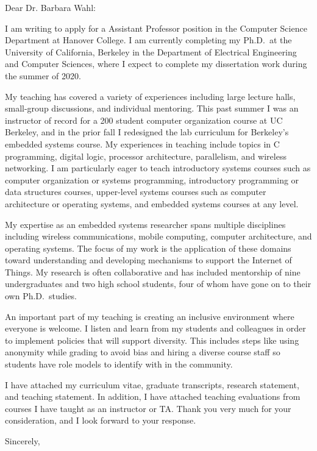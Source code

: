 \documentclass{letter}
\begin{document}
\begin{letter}{}
\date{}

\opening{Dear Dr. Barbara Wahl:}

I am writing to apply for a
Assistant Professor
position in the
Computer Science Department
at Hanover College.
%
I am currently completing my Ph.D.\ at the University of California, Berkeley
in the Department of Electrical Engineering and Computer Sciences, where I
expect to complete my dissertation work during the summer of 2020.

My teaching has covered a variety of experiences including
large lecture halls, small-group discussions, and individual mentoring.
%
This past summer I was an instructor of record for a 200 student computer
organization course at UC Berkeley, and in the prior fall I redesigned the lab
curriculum for Berkeley's embedded systems course.
%
My experiences in teaching include topics in C programming, digital logic,
processor architecture, parallelism, and wireless networking.
%
%
I am particularly eager to teach
introductory systems courses such as computer organization or systems programming,
introductory programming or data structures courses,
upper-level systems courses such as computer architecture or operating systems,
and embedded systems courses at any level.

My expertise as an embedded systems researcher spans multiple disciplines
including wireless communications, mobile computing, computer architecture, and
operating systems.
%
The focus of my work is the application of these domains toward understanding
and developing mechanisms to support the Internet of Things.
%
My research is often collaborative and has included mentorship of nine
undergraduates and two high school students, four of whom have gone on to
their own Ph.D.\ studies.


An important part of my teaching is creating an inclusive environment where
everyone is welcome. I listen and learn from my students and colleagues
in order to implement policies that will support diversity.
%
This includes steps like using anonymity while grading to avoid bias and hiring
a diverse course staff so students have role models to identify with in the community.

I have attached
my curriculum vitae,
graduate transcripts,
research statement,
and teaching statement.
In addition, I have attached teaching evaluations from courses I have taught
as an instructor or TA.
%
Thank you very much for your consideration, and I look forward to your response.

\closing{Sincerely,}

\end{letter}
\end{document}
